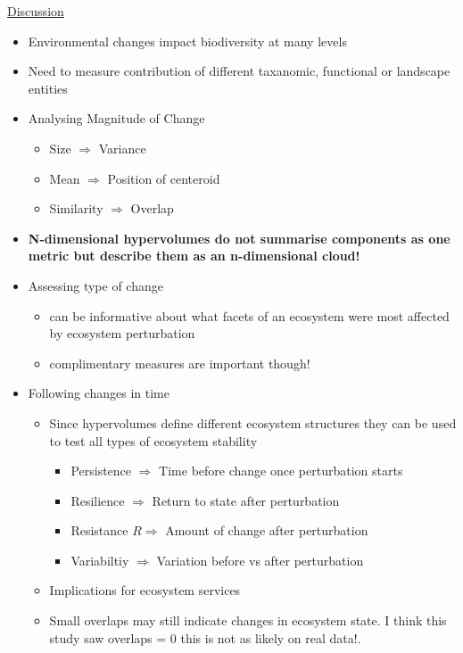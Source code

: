 \underline{Discussion} 
\begin{itemize}
	\item Environmental changes impact biodiversity at many levels
	\item Need to measure contribution of different taxanomic, functional or landscape entities
	
	\item Analysing Magnitude of Change
	\begin{itemize}
		\item Size $\Rightarrow$ Variance
		\item Mean $\Rightarrow$ Position of centeroid
		\item Similarity $\Rightarrow$ Overlap
	\end{itemize}

	\item \textbf{N-dimensional hypervolumes do not summarise components as one metric but describe them as an n-dimensional cloud!}
	
	\item Assessing type of change
	\begin{itemize}
		\item can be informative about what facets of an ecosystem were most affected by ecosystem perturbation
		\item complimentary measures are important though!
	\end{itemize}

	\item Following changes in time
	\begin{itemize}
		\item Since hypervolumes define different ecosystem structures they can be used to test all types of ecosystem stability
		\begin{itemize}
			\item Persistence $\Rightarrow$ Time before change once perturbation starts
			\item Resilience $\Rightarrow$ Return to state after perturbation
			\item Resistance $R\Rightarrow$ Amount of change after perturbation
			\item Variabiltiy $\Rightarrow$ Variation before vs after perturbation
		\end{itemize}
		\item Implications for ecosystem services
		\item Small overlaps may still indicate changes in ecosystem state. I think this study saw overlaps = 0 this is not as likely on real data!. 
	\end{itemize}


\end{itemize}
